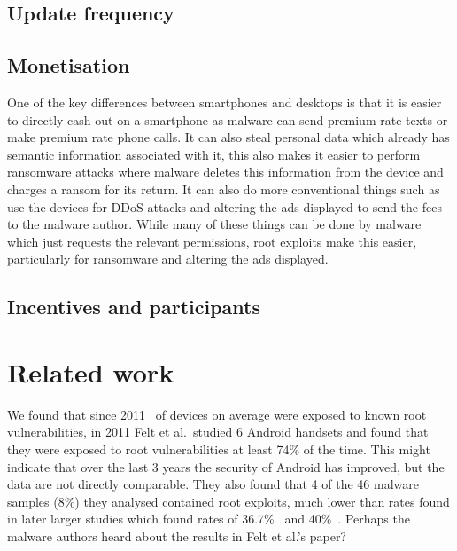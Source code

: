 \documentclass[conference,a4paper,twoside]{IEEEtran}
\begin{document}
\subsection{Update frequency}



\subsection{Monetisation}
One of the key differences between smartphones and desktops is that it is easier to directly cash out on a smartphone as malware can send premium rate texts or make premium rate phone calls.
It can also steal personal data which already has semantic information associated with it, this also makes it easier to perform ransomware attacks where malware deletes this information from the device and charges a ransom for its return.
It can also do more conventional things such as use the devices for DDoS attacks and altering the ads displayed to send the fees to the malware author.
While many of these things can be done by malware which just requests the relevant permissions, root exploits make this easier, particularly for ransomware and altering the ads displayed.

\subsection{Incentives and participants}
\label{sec:economics}
\cite{Felt2011}

\section{Related work}
\label{sec:related}
We found that since 2011 \daMeanInsecurityPerc\ of devices on average were exposed to known root vulnerabilities, in 2011 Felt et al.\ studied 6 Android handsets and found that they were exposed to root vulnerabilities at least 74\% of the time.
This might indicate that over the last 3 years the security of Android has improved, but the data are not directly comparable.
They also found that 4 of the 46 malware samples (8\%) they analysed contained root exploits, much lower than rates found in later larger studies which found rates of 36.7\%~\cite{Zhou2012b} and 40\%~\cite{Zhou2012a}.
Perhaps the malware authors heard about the results in Felt et al.'s paper?
\end{document}
